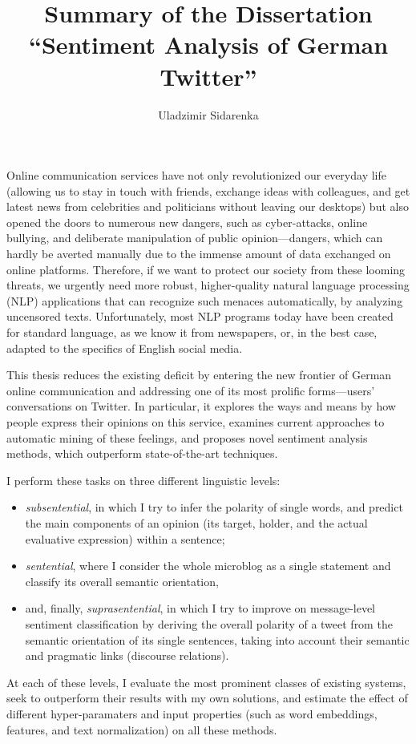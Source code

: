 \documentclass[11pt]{article}
\author{Uladzimir Sidarenka}
\title{  {\large Summary of the Dissertation}\\[0.5em]
  {\Large ``Sentiment Analysis of German Twitter''}}
\date{\vspace{-3ex}}
\begin{document}
\maketitle

Online communication services have not only revolutionized our
everyday life (allowing us to stay in touch with friends, exchange
ideas with colleagues, and get latest news from celebrities and
politicians without leaving our desktops) but also opened the doors to
numerous new dangers, such as cyber-attacks, online bullying, and
deliberate manipulation of public opinion---dangers, which can hardly
be averted manually due to the immense amount of data exchanged on
online platforms.  Therefore, if we want to protect our society from
these looming threats, we urgently need more robust, higher-quality
natural language processing (NLP) applications that can recognize such
menaces automatically, by analyzing uncensored texts.  Unfortunately,
most NLP programs today have been created for standard language, as we
know it from newspapers, or, in the best case, adapted to the
specifics of English social media.

This thesis reduces the existing deficit by entering the new frontier
of German online communication and addressing one of its most prolific
forms---users' conversations on Twitter.  In particular, it explores
the ways and means by how people express their opinions on this
service, examines current approaches to automatic mining of these
feelings, and proposes novel sentiment analysis methods, which
outperform state-of-the-art techniques.

I perform these tasks on three different linguistic levels:
\begin{itemize}
  \item\emph{subsentential}, in which I try to infer the polarity of
    single words, and predict the main components of an opinion (its
    target, holder, and the actual evaluative expression) within a
    sentence;

  \item\emph{sentential}, where I consider the whole microblog as a
    single statement and classify its overall semantic orientation,

  \item and, finally, \emph{suprasentential}, in which I try to
    improve on message-level sentiment classification by deriving the
    overall polarity of a tweet from the semantic orientation of its
    single sentences, taking into account their semantic and pragmatic
    links (discourse relations).
\end{itemize}
At each of these levels, I evaluate the most prominent classes of
existing systems, seek to outperform their results with my own
solutions, and estimate the effect of different hyper-paramaters and
input properties (such as word embeddings, features, and text
normalization) on all these methods.
\end{document}
